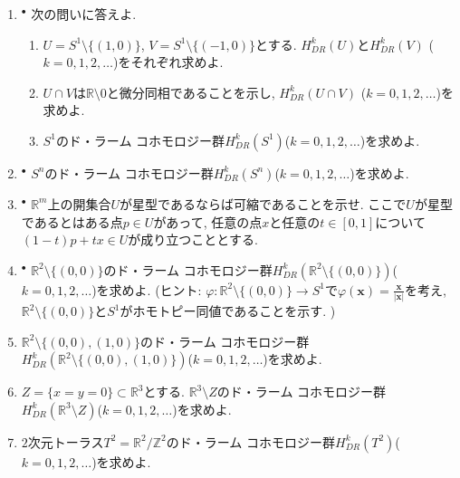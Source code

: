 \documentclass[dvipdfmx,a4paper,11pt]{article}
\newcommand{\R}{\mathbb{R}}
\newcommand{\Z}{\mathbb{Z}}
\theoremstyle{definition}
\begin{document}
\begin{enumerate}[label=\textbf{問}\ref*{sec-deRham}.\arabic*]
\item \label{circle_cohomology}$^\bullet$ 次の問いに答えよ.
\begin{enumerate}
 \setlength{\parskip}{0cm}
  \setlength{\itemsep}{2pt}
  \item $U = S^1 \setminus \{(1,0)\}$, $V = S^1 \setminus \{(-1,0)\}$とする. $H^{k}_{DR}(U)$と$ H^{k}_{DR}(V)$ ($k=0,1,2,\ldots$)をそれぞれ求めよ.
  \item $U \cap V$は$\R \setminus 0$と微分同相であることを示し, $H^{k}_{DR}(U \cap V)$ ($k=0,1,2,\ldots$)を求めよ.
  \item $S^1$のド・ラーム コホモロジー群$H^{k}_{DR}(S^1)$($k=0,1,2,\ldots$)を求めよ.
\end{enumerate}

\item $^\bullet$ $S^n$のド・ラーム コホモロジー群$H^{k}_{DR}(S^n)$($k=0,1,2,\ldots$)を求めよ.

\item  $^\bullet$ $\R^m$上の開集合$U$が星型であるならば可縮であることを示せ. ここで$U$が星型であるとはある点$p \in U$があって, 任意の点$x$と任意の$t \in [0,1]$について$(1-t)p + t x \in U$が成り立つこととする. 

\item  $^\bullet$ $\R^2 \setminus \{ (0,0) \}$のド・ラーム コホモロジー群$H^{k}_{DR}(\R^2 \setminus \{ (0,0) \})$($k=0,1,2,\ldots$)を求めよ. (ヒント: $\varphi : \R^2 \setminus \{(0,0)\}\to S^1$で$\varphi(\bm{x}) = \frac{\bm{x}}{|\bm{x}|}$を考え,  $\R^2 \setminus \{(0,0)\}$と$S^1$がホモトピー同値であることを示す. )




\item \label{circle_2_cohomology} $\R^2 \setminus \{(0,0) , (1,0)\} $のド・ラーム コホモロジー群$H^{k}_{DR}(\R^2 \setminus \{ (0,0), (1,0) \})$($k=0,1,2,\ldots$)を求めよ.

\item $Z = \{ x=y=0\} \subset \R^3$とする. $\R^3 \setminus Z$のド・ラーム コホモロジー群$H^{k}_{DR}( \R^3 \setminus Z)$($k=0,1,2,\ldots$)を求めよ.

\item $2$次元トーラス$T^2 = \R^2/ \Z^2$のド・ラーム コホモロジー群$H^{k}_{DR}(T^2)$($k=0,1,2,\ldots$)を求めよ.


\end{enumerate}
\end{document}

